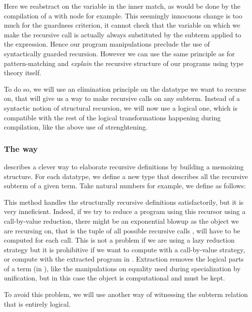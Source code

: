 Here we reabstract on the  variable in the inner match, as would
be done by the compilation of a with node for example. This seemingly 
innocuous change is too much for the guardness criterion, it cannot
check that the  variable on which we make the recursive call
is actually always substituted by the subterm  applied to
the  expression. Hence our program manipulations preclude
the use of syntactically guarded recursion. However we 
can use the same principle as for pattern-matching and 
\emph{explain} the recursive structure of our programs using type theory
itself. 

To do so, we will use an elimination principle on the datatype we want
to recurse on, that will give us a way to make recursive calls on any
subterm. Instead of a syntactic notion of structural recursion, we will now use a
logical one, which is compatible with the rest of the logical
transformations happening during compilation, like the above use of
strenghtening.

\subsubsection{The \Below way}

\cite{DBLP:conf/birthday/GoguenMM06} describes a clever way to
elaborate recursive definitions by building a memoizing structure. 
For each datatype, we define a new type  that describes all
the recursive subterm of a given term. Take natural numbers for example,
we define  as follows:



This method handles the structurally recursive definitions
satisfactorily, but it is very inneficient. Indeed, if we try to reduce 
a program using this recursor using a call-by-value reduction,
there might be an exponential blowup as 
the object we are recursing on, that is the tuple of all possible
recursive calls , will have to be computed for each call. This is not 
a problem if we are using a lazy reduction strategy but it is
prohibitive if we want to compute with a call-by-value strategy, 
or compute with the extracted program in \ML. Extraction removes the 
logical parts of a term (in \Prop), like the manipulations on equality
used during specialization by unification, but in this case the
 object is computational and must be kept.

To avoid this problem, we will use another way of witnessing the subterm
relation that is entirely logical.

